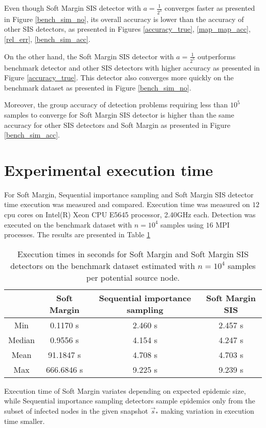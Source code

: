 \documentclass[times, utf8, diplomski]{fer}
\begin{document}
Even though Soft Margin SIS detector with $a=\frac{1}{2^3}$ converges faster as presented in Figure \ref{bench_sim_no}, its overall accuracy is lower  than the accuracy of other SIS detectors, as presented in Figures \ref{accuracy_true}, \ref{map_map_acc}, \ref{rel_err}, \ref{bench_sim_acc}.

On the other hand, the Soft Margin SIS detector with $a = \frac{1}{2^5}$ outperforms benchmark detector and other SIS detectors with higher accuracy as presented in Figure \ref{accuracy_true}. This detector also converges more quickly  on the benchmark dataset as presented in Figure \ref{bench_sim_no}. 

Moreover, the group accuracy of detection problems requiring less than $10^5$ samples to converge for Soft Margin SIS detector is higher than the same accuracy for other SIS detectors and Soft Margin as presented in Figure \ref{bench_sim_acc}.

\section{Experimental execution time}

For Soft Margin, Sequential importance sampling and Soft Margin SIS detector time execution was measured and compared.  Execution time was measured on $12$ cpu cores on  Intel(R) Xeon CPU  E5645 processor, 2.40GHz each. Detection was executed on the benchmark dataset with $n = 10^4$ samples using $16$ MPI processes. The results are presented in Table \ref{execution}

\begin{table}[H]
\center
\begin{tabular}{|c|c|c|c|}
\hline 
  & Soft Margin & Sequential importance sampling & Soft Margin SIS \\ 
\hline 
Min &  0.1170  s & 2.460 s & 2.457  s\\ 
\hline 
Median &  0.9556 s & 4.154  s & 4.247 s  \\ 
\hline 
Mean &  91.1847  s & 4.708 s    & 4.703  s \\ 
\hline 
Max & 666.6846 s & 9.225  s& 9.239  s
 \\ 
\hline 
\end{tabular} 
\caption{Execution times in seconds for Soft Margin and Soft Margin SIS detectors on the benchmark dataset estimated with $n = 10^4$ samples per potential source node.}
\label{execution}
\end{table} 

Execution time of Soft Margin variates depending on expected epidemic size, while Sequential importance sampling detectors sample epidemics only from the subset of infected nodes in the given snapshot $\vec s_*$ making variation in execution time smaller.
\end{document}
